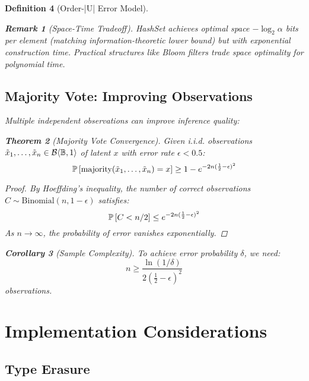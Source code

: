 \documentclass[11pt,final,hidelinks]{article}
\newtheorem{theorem}{Theorem}[section]
\newtheorem{corollary}[theorem]{Corollary}
\newtheorem{definition}[theorem]{Definition}
\newtheorem{remark}[theorem]{Remark}
\newcommand{\bernoulli}[2]{\mathcal{B}\langle #1, #2 \rangle}
\begin{document}
\begin{definition}[Order-|U| Error Model]
\begin{remark}[Space-Time Tradeoff]
HashSet achieves optimal space $-\log_2 \alpha$ bits per element (matching information-theoretic lower bound) but with exponential construction time. Practical structures like Bloom filters trade space optimality for polynomial time.
\end{remark}

\subsection{Majority Vote: Improving Observations}

Multiple independent observations can improve inference quality:

\begin{theorem}[Majority Vote Convergence]
Given i.i.d. observations $\tilde{x}_1, \ldots, \tilde{x}_n \in \bernoulli{\Bool}{1}$ of latent $x$ with error rate $\epsilon < 0.5$:
\begin{equation}
\mathbb{P}\left[\text{majority}(\tilde{x}_1, \ldots, \tilde{x}_n) = x\right] \geq 1 - e^{-2n(\frac{1}{2} - \epsilon)^2}
\end{equation}
\end{theorem}

\begin{proof}
By Hoeffding's inequality, the number of correct observations $C \sim \text{Binomial}(n, 1-\epsilon)$ satisfies:
\begin{equation}
\mathbb{P}\left[C < n/2\right] \leq e^{-2n(\frac{1}{2} - \epsilon)^2}
\end{equation}
As $n \to \infty$, the probability of error vanishes exponentially.
\end{proof}

\begin{corollary}[Sample Complexity]
To achieve error probability $\delta$, we need:
\begin{equation}
n \geq \frac{\ln(1/\delta)}{2(\frac{1}{2} - \epsilon)^2}
\end{equation}
observations.
\end{corollary}

\section{Implementation Considerations}

\subsection{Type Erasure}


\end{definition}
\end{document}
